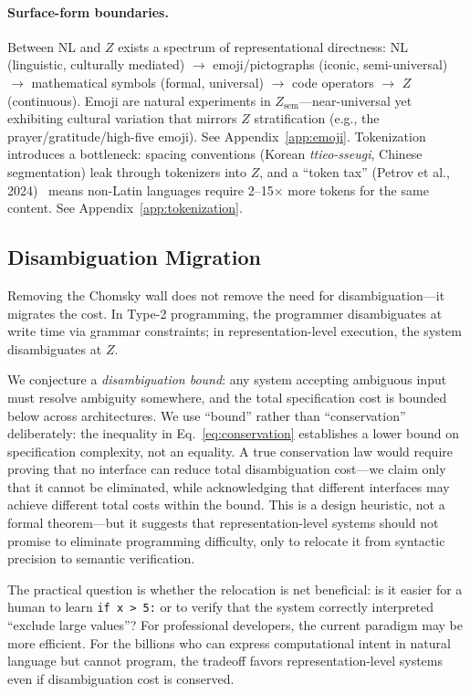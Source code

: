\documentclass{article}
\theoremstyle{definition}
\newcommand{\Zsem}{Z_{\text{sem}}}
\begin{document}
\paragraph{Surface-form boundaries.}
Between NL and $Z$ exists a spectrum of representational directness: NL (linguistic, culturally mediated) $\to$ emoji/pictographs (iconic, semi-universal) $\to$ mathematical symbols (formal, universal) $\to$ code operators $\to$ $Z$ (continuous). Emoji are natural experiments in $\Zsem$---near-universal yet exhibiting cultural variation that mirrors $Z$ stratification (e.g., the prayer/gratitude/high-five emoji). See Appendix~\ref{app:emoji}. Tokenization introduces a bottleneck: spacing conventions (Korean \emph{ttieo-sseugi}, Chinese segmentation) leak through tokenizers into $Z$, and a ``token tax'' (Petrov et al., 2024)~\citep{petrov2024tokenizers} means non-Latin languages require 2--15$\times$ more tokens for the same content. See Appendix~\ref{app:tokenization}.

\subsection{Disambiguation Migration}\label{sec:disambiguation}

Removing the Chomsky wall does not remove the need for disambiguation---it migrates the cost. In Type-2 programming, the programmer disambiguates at write time via grammar constraints; in representation-level execution, the system disambiguates at $Z$.

We conjecture a \emph{disambiguation bound}: any system accepting ambiguous input must resolve ambiguity somewhere, and the total specification cost is bounded below across architectures. We use ``bound'' rather than ``conservation'' deliberately: the inequality in Eq.~\ref{eq:conservation} establishes a lower bound on specification complexity, not an equality. A true conservation law would require proving that no interface can reduce total disambiguation cost---we claim only that it cannot be eliminated, while acknowledging that different interfaces may achieve different total costs within the bound. This is a design heuristic, not a formal theorem---but it suggests that representation-level systems should not promise to eliminate programming difficulty, only to relocate it from syntactic precision to semantic verification.

The practical question is whether the relocation is net beneficial: is it easier for a human to learn \texttt{if x > 5:} or to verify that the system correctly interpreted ``exclude large values''? For professional developers, the current paradigm may be more efficient. For the billions who can express computational intent in natural language but cannot program, the tradeoff favors representation-level systems even if disambiguation cost is conserved.
\end{document}
